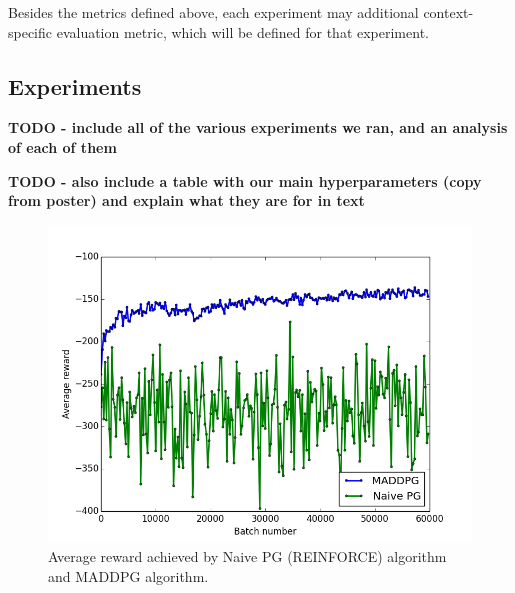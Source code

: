 \documentclass{article}
\begin{document}
Besides the metrics defined above, each experiment may additional context-specific evaluation metric, which will be defined for that experiment.


\subsection{Experiments}

\textbf{TODO - include all of the various experiments we ran, and an analysis of each of them}

\textbf{TODO - also include a table with our main hyperparameters (copy from poster) and explain what they are for in text}

\begin{figure}
\begin{center}
\includegraphics[scale=0.4]{MADDPGvsPG}
\end{center}
\caption{Average reward achieved by Naive PG (REINFORCE) algorithm and MADDPG algorithm.}
\label{fig:MADDPGvsPG}
\end{figure}
\end{document}
